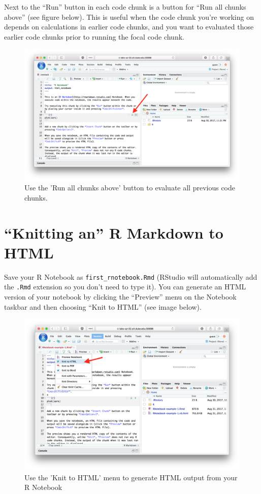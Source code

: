 \documentclass[]{book}
\theoremstyle{definition}
\theoremstyle{definition}
\theoremstyle{definition}
\theoremstyle{remark}
\begin{document}
Next to the ``Run'' button in each code chunk is a button for ``Run all
chunks above'' (see figure below). This is useful when the code chunk
you're working on depends on calculations in earlier code chunks, and
you want to evaluated those earlier code chunks prior to running the
focal code chunk.

\begin{figure}

{\centering \includegraphics[width=0.6\linewidth]{./figures/fig-code-chunk-runall} 

}

\caption{Use the 'Run all chunks above' button to evaluate all previous code chunks.}\label{fig:unnamed-chunk-78}
\end{figure}

\hypertarget{knitting-an-r-markdown-to-html}{%
\section{``Knitting an'' R Markdown to
HTML}\label{knitting-an-r-markdown-to-html}}

Save your R Notebook as \texttt{first\_rnotebook.Rmd} (RStudio will
automatically add the \texttt{.Rmd} extension so you don't need to type
it). You can generate an HTML version of your notebook by clicking the
``Preview'' menu on the Notebook taskbar and then choosing ``Knit to
HTML'' (see image below).

\begin{figure}

{\centering \includegraphics[width=0.6\linewidth]{./figures/fig-rstudio-knit-to-html} 

}

\caption{Use the 'Knit to HTML' menu to generate HTML output from your R Notebook}\label{fig:unnamed-chunk-79}
\end{figure}
\end{document}
